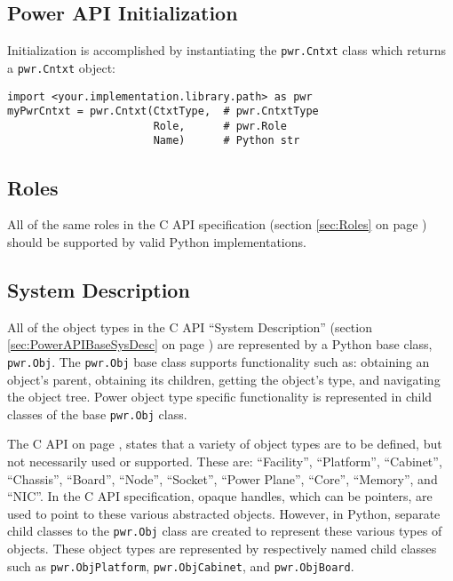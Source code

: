 \subsection{Power API Initialization}\label{sec:PythonPowerAPIInitialization}
Initialization is accomplished by instantiating the \texttt{pwr.Cntxt} class
which returns a \texttt{pwr.Cntxt} object:

\begin{center}\begin{minipage}{.95\linewidth}\begin{lstlisting}
import <your.implementation.library.path> as pwr
myPwrCntxt = pwr.Cntxt(CtxtType,  # pwr.CntxtType
                       Role,      # pwr.Role
                       Name)      # Python str
\end{lstlisting}\end{minipage}\end{center}

\subsection{Roles}\label{sec:PythonRoles}
All of the same roles in the C API specification (section \ref{sec:Roles} on
page \pageref{sec:Roles}) should be supported by valid Python implementations.

\subsection{System Description}\label{sec:PythonSystemDescription}

All of the object types in the C API ``System Description'' (section
\ref{sec:PowerAPIBaseSysDesc}  on page \pageref{sec:PowerAPIBaseSysDesc}) are
represented by a Python base class, \texttt{pwr.Obj}. The \texttt{pwr.Obj} base
class supports functionality such as: obtaining an object's parent, obtaining
its children, getting the object's type, and navigating the object tree. Power
object type specific functionality is represented in child classes of the base
\texttt{pwr.Obj} class.

The C API on page \pageref{sec:PowerAPIBaseSysDesc}, states that a variety
of object types are to be defined, but not necessarily used or supported. These
are: ``Facility'', ``Platform'', ``Cabinet'', ``Chassis'', ``Board'', ``Node'', ``Socket'',
``Power Plane'', ``Core'', ``Memory'', and ``NIC''. In the C API specification,
opaque handles, which can be pointers, are used to point to these various abstracted
objects.  However, in Python, separate child classes to the \texttt{pwr.Obj} class
are created to represent these various types of objects. These object types are
represented by respectively named child classes such as
\texttt{pwr.ObjPlatform}, \texttt{pwr.ObjCabinet}, and \texttt{pwr.ObjBoard}.

